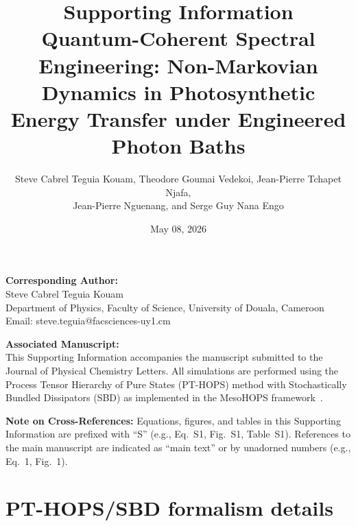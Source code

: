 \documentclass[11pt,a4paper]{article}
\begin{document}
\title{\textbf{Supporting Information}\\[0.5em]
\large Quantum-Coherent Spectral Engineering: Non-Markovian Dynamics in Photosynthetic Energy Transfer under Engineered Photon Baths}

\author{Steve Cabrel Teguia Kouam, Theodore Goumai Vedekoi, Jean-Pierre Tchapet Njafa,\\ Jean-Pierre Nguenang, and Serge Guy Nana Engo}

\date{May 08, 2026}

\maketitle

\noindent\textbf{Corresponding Author:}\\
Steve Cabrel Teguia Kouam\\
Department of Physics, Faculty of Science, University of Douala, Cameroon\\
Email: steve.teguia@facsciences-uy1.cm

\vspace{1em}
\noindent\textbf{Associated Manuscript:}\\
This Supporting Information accompanies the manuscript submitted to the Journal of Physical Chemistry Letters. All simulations are performed using the Process Tensor Hierarchy of Pure States (PT-HOPS) method with Stochastically Bundled Dissipators (SBD) as implemented in the MesoHOPS framework~\cite{Varvelo2021a,Citty2024a}.

\tableofcontents

\newpage

\noindent\textbf{Note on Cross-References:} Equations, figures, and tables in this Supporting Information are prefixed with ``S'' (e.g., Eq.~S1, Fig.~S1, Table~S1). References to the main manuscript are indicated as ``main text'' or by unadorned numbers (e.g., Eq.~1, Fig.~1).

\vspace{1em}


\section{PT-HOPS/SBD formalism details}
\label{sec:formalism}
\end{document}
